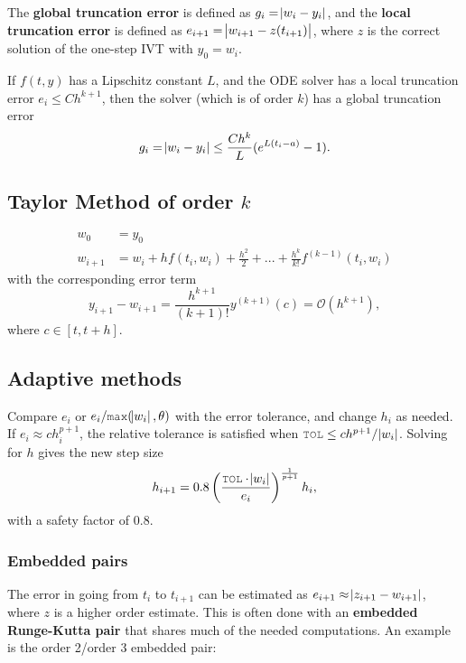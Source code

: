\begin{definition}
The \textbf{global truncation error} is defined as $g_i = \abs{w_i-y_i}$, and the \textbf{local truncation error} is defined as $e_{i+1} = \abs{w_{i+1} - z(t_{i+1})}$, where $z$ is the correct solution of the one-step IVT with $y_0 = w_i$.
\end{definition}

\begin{theorem}
If $f(t,y)$ has a Lipschitz constant $L$, and the ODE solver has a local truncation error $e_i \leq C h^{k+1}$, then the solver (which is of order $k$) has a global truncation error
$$
g_i = \abs{w_i - y_i} \leq \frac{Ch^k}{L}(e^{L(t_i - a)} - 1).
$$
\end{theorem}

\subsection{Taylor Method of order $k$}
\begin{align*}
    w_0 & = y_0 \\
    w_{i+1} & = w_i + h f(t_i, w_i) + \frac{h^2}{2} + ... + \frac{h^k}{k!}f^{(k-1)}(t_i, w_i)
\end{align*}
with the corresponding error term 
$$
y_{i+1} - w_{i+1}  =  \frac{h^{k+1}}{(k+1)!}y^{(k+1)}(c) = \mathcal{O}(h^{k+1}),
$$
where $c \in [t, t+h]$.

\subsection{Adaptive methods}
Compare $e_i$ or $e_i/\mcode{max}(\abs{w_i}, \theta)$ with the error tolerance, and change $h_i$ as needed. If $e_i \approx ch_i^{p+1}$, the relative tolerance  is satisfied when $\mcode{TOL} \leq ch^{p+1} / \abs{w_i}$. Solving for $h$ gives the new step size
$$
h_{i+1} = 0.8\left(\frac{\mcode{TOL} \cdot \abs{w_i}}{e_i}\right)^{\frac{1}{p+1}} h_i,
$$
with a safety factor of $0.8$.

\subsubsection{Embedded pairs}
The error in going from $t_i$ to $t_{i+1}$ can be estimated as $e_{i+1} \approx \abs{z_{i+1} - w_{i+1}}$, where $z$ is a higher order estimate. This is often done with an \textbf{embedded Runge-Kutta pair} that shares much of the needed computations. An example is the order 2/order 3 embedded pair:

